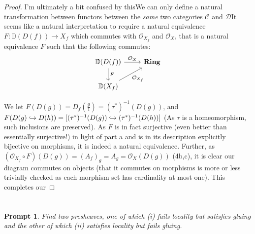 \documentclass[english]{article}
\newcommand{\DD}{\mathbb{D}}
\newcommand{\OO}{\mathcal{O}}
\newcommand{\Dcal}{\mathcal{D}}
\newcommand{\Ccal}{\mathcal{C}}
\newcommand{\prob}[1]{\setcounter{section}{#1-1}\section{}}
\newtheorem*{prompt*}{Prompt}
\theoremstyle{remark}
\theoremstyle{definition}
\newcommand{\cat}[1]{{\mathrm{\bf{#1}}}}
\begin{document}
\begin{proof} I'm ultimately a bit confused by this\textellipsis We can only define a natural transformation between functors between the \emph{same} two categories $\Ccal$ and $\Dcal$\textellipsis It seems like a natural interpretation to require a natural equivalence $F:\DD(D(f))\to X_f$ which commutes with $\OO_{X_f}$ and $\OO_X$, that is a natural equivalence $F$ such that the following commutes: $$
	\begin{tikzcd}
	\DD(D(f))\arrow{r}{\OO_X}\arrow{d}{F}&\cat{Ring}\\
	\DD(X_f)\arrow{ru}[swap]{\OO_{X_f}}
	\end{tikzcd}$$
	
	We let $F(D(g))=D_f(\frac{g}{1})=(\tau^*)^{-1}(D(g))$, and $F(D(g)\xhookrightarrow{}D(h))=[(\tau^*)^{-1}(D(g))\xhookrightarrow[]{}(\tau^*)^{-1}(D(h))]$ (As $\tau$ is a homeomorphism, such inclusions are preserved). As $F$ is in fact surjective (even better than essentially surjective!) in light of part a and is in its description explicitly bijective on morphisms, it is indeed a natural equivalence. Further, as $(\OO_{X_f}\circ F)(D(g))=(A_f)_g=A_g=\OO_X(D(g))$ (4b,c), it is clear our diagram commutes on objects (that it commutes on morphisms is more or less trivially checked as each morphism set has cardinality at most one). This completes our  
\end{proof}
\prob{6}
\begin{prompt*}
	Find two presheaves, one of which \emph{(i)} fails locality but satisfies gluing and the other of which \emph{(ii)} satisfies locality but fails gluing.
\end{prompt*}
\end{document}

